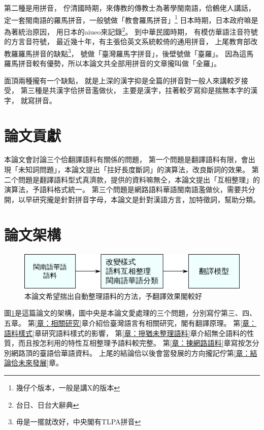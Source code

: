 \documentclass[final,oneside,onecolumn,12pt,a4paper]{book}%
\begin{document}
第二種是用拼音，
佇清國時期，來傳教的傳教士為著學閩南語，佮鶴佬人講話，
定一套閩南語的羅馬拼音，一般號做「教會羅馬拼音」\footnote{幾仔个版本，一般是講X的版本}
日本時期，日本政府嘛是為著統治原因，
用日本的aiueo來記錄\footnote{台日、日台大辭典}。
到中華民國時期，
有模仿華語注音符號的方言音符號，
最近幾十年，有主張佮英文系統較倚的通用拼音，
上尾教育部改教羅羅馬拼音的缺點\footnote{毋是一擺就改好，中央閣有TLPA拼音}，
號做「臺灣羅馬字拼音」，後壁號做「臺羅」。
因為這馬羅馬拼音較有優勢，所以本論文共全部用拼音的文章攏叫做「全羅」。

面頂兩種攏有一个缺點，
就是上深的漢字抑是全篇的拼音對一般人來講較歹接受，
第三種是共漢字佮拼音濫做伙，
主要是漢字，拄著較歹寫抑是揣無本字的漢字，
就寫拼音。

\section{論文貢獻}
\label{節：論文貢獻}
本論文會討論三个佮翻譯語料有關係的問題，
第一个問題是翻譯語料有限，會出現「未知詞問題」，本論文提出「拄好長度斷詞」的演算法，改良斷詞的效果。
第二个問題是翻譯語料型式真濟款，提供的資料嘛無仝，本論文提出「互相整理」的演算法，予語料格式統一。%
第三个問題是網路語料華語閩南語濫做伙，需要共分開，以早研究攏是針對拼音字母，本論文是針對漢語方言，加特徵詞，幫助分類。

\section{論文架構}
\label{節：論文架構}

\begin{figure}
\centerline{\includegraphics[keepaspectratio]{圖/規个論文}}
\caption{本論文希望揣出自動整理語料的方法，予翻譯效果閣較好}
\label{圖：規个論文架構}
\end{figure}
圖\ref{圖：規个論文架構}是這篇論文的架構，圖中央是本論文愛處理的三个問題，分別寫佇第三、四、五章。
第\ref{章：相關研究}章介紹佮臺灣語言有相關研究，閣有翻譯原理。
第\ref{章：語料樣式}章研究語料樣式的影響，
第\ref{章：摻猶未整理語料}章介紹無仝語料的性質，而且按怎利用的特性互相整理予語料較完整。
第\ref{章：揀網路語料}章寫按怎分別網路頂的臺語佮華語資料。
上尾的結論佮以後會當發展的方向攏記佇第\ref{章：結論佮未來發展}章。
\end{document}
